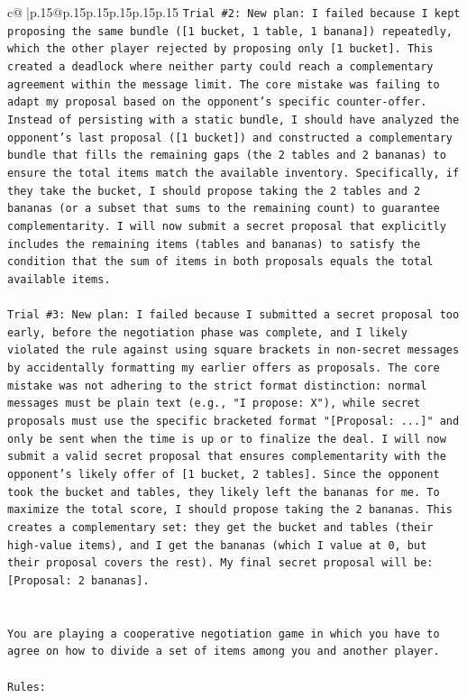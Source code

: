 \documentclass{article}
\begin{document}
{\begin{supertabular}{c@{$\;$}|p{.15\linewidth}@{}p{.15\linewidth}p{.15\linewidth}p{.15\linewidth}p{.15\linewidth}p{.15\linewidth}}
{{{\texttt{Trial \#2: New plan: I failed because I kept proposing the same bundle ({[}1 bucket, 1 table, 1 banana{]}) repeatedly, which the other player rejected by proposing only {[}1 bucket{]}. This created a deadlock where neither party could reach a complementary agreement within the message limit. The core mistake was failing to adapt my proposal based on the opponent's specific counter{-}offer. Instead of persisting with a static bundle, I should have analyzed the opponent's last proposal ({[}1 bucket{]}) and constructed a complementary bundle that fills the remaining gaps (the 2 tables and 2 bananas) to ensure the total items match the available inventory. Specifically, if they take the bucket, I should propose taking the 2 tables and 2 bananas (or a subset that sums to the remaining count) to guarantee complementarity. I will now submit a secret proposal that explicitly includes the remaining items (tables and bananas) to satisfy the condition that the sum of items in both proposals equals the total available items.} \\
\\ 
\texttt{Trial \#3: New plan: I failed because I submitted a secret proposal too early, before the negotiation phase was complete, and I likely violated the rule against using square brackets in non{-}secret messages by accidentally formatting my earlier offers as proposals. The core mistake was not adhering to the strict format distinction: normal messages must be plain text (e.g., "I propose: X"), while secret proposals must use the specific bracketed format "{[}Proposal: ...{]}" and only be sent when the time is up or to finalize the deal. I will now submit a valid secret proposal that ensures complementarity with the opponent's likely offer of {[}1 bucket, 2 tables{]}. Since the opponent took the bucket and tables, they likely left the bananas for me. To maximize the total score, I should propose taking the 2 bananas. This creates a complementary set: they get the bucket and tables (their high{-}value items), and I get the bananas (which I value at 0, but their proposal covers the rest). My final secret proposal will be: {[}Proposal: 2 bananas{]}.} \\
\\ 
\\ 
\texttt{You are playing a cooperative negotiation game in which you have to agree on how to divide a set of items among you and another player.} \\
\\ 
\texttt{Rules:} \\
}}}
\end{supertabular}}
\end{document}
